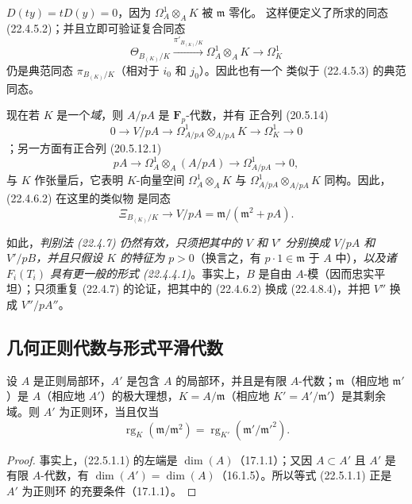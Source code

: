 \begin{remark}[22.4.8]

$D(ty)=tD(y)=0$，因为 $\Omega^1_A\otimes_AK$ 被 $\mathfrak m$ 零化。
这样便定义了所求的同态 (22.4.5.2)；并且立即可验证复合同态
\[
  \Theta_{B_{(K)}/K}\xrightarrow{\pi'_{B_{(K)}/K}}
  \Omega^1_A\otimes_AK\longrightarrow\Omega^1_K
\]
仍是典范同态 $\pi_{B_{(K)}/K}$（相对于 $i_0$ 和 $j_0$）。因此也有一个
类似于 (22.4.5.3) 的典范同态。

现在若 $K$ 是一个\emph{域}，则 $A/pA$ 是 $\mathbf F_p$-代数，并有
正合列 (20.5.14)
\[
  0\longrightarrow V/pA\longrightarrow
  \Omega^1_{A/pA}\otimes_{A/pA}K\longrightarrow\Omega^1_K\longrightarrow0
\]
；另一方面有正合列 (20.5.12.1)
\[
  pA\longrightarrow\Omega^1_A\otimes_A(A/pA)
  \longrightarrow\Omega^1_{A/pA}\longrightarrow0,
\]
与 $K$ 作张量后，它表明 $K$-向量空间
$\Omega^1_A\otimes_AK$ 与
$\Omega^1_{A/pA}\otimes_{A/pA}K$ 同构。因此，(22.4.6.2) 在这里的类似物
是同态
\begin{equation}
\label{0.22.4.8.4-fr}
  \Xi_{B_{(K)}/K}\longrightarrow V/pA=\mathfrak m/(\mathfrak m^2+pA).
  \tag{22.4.8.4}
\end{equation}

如此，\emph{判别法 (22.4.7) 仍然有效，只须把其中的 $V$ 和 $V'$ 分别换成
$V/pA$ 和 $V'/pB$，并且只假设 $K$ 的特征为 $p>0$}（换言之，有
$p\cdot1\in\mathfrak m$ 于 $A$ 中），\emph{以及诸 $F_i(T_i)$ 具有更一般的形式
(22.4.4.1)}。事实上，$B$ 是自由 $A$-模（因而忠实平坦）；只须重复
(22.4.7) 的论证，把其中的 (22.4.6.2) 换成 (22.4.8.4)，并把 $V''$ 换成
$V''/pA''$。
\end{remark}

\subsection{几何正则代数与形式平滑代数}
\label{subsection:0.22.5-fr}

\begin{proposition}[22.5.1]
\label{0.22.5.1-fr}
设 $A$ 是正则局部环，$A'$ 是包含 $A$ 的局部环，并且是有限
$A$-代数；$\mathfrak m$（相应地 $\mathfrak m'$）是 $A$（相应地
$A'$）的极大理想，$K=A/\mathfrak m$（相应地
$K'=A'/\mathfrak m'$）是其剩余域。则 $A'$ 为正则环，当且仅当
\begin{equation}
\label{0.22.5.1.1-fr}
  \operatorname{rg}_K(\mathfrak m/\mathfrak m^2)
  =\operatorname{rg}_{K'}(\mathfrak m'/\mathfrak m'^2).
  \tag{22.5.1.1}
\end{equation}
\end{proposition}

\begin{proof}
事实上，(22.5.1.1) 的左端是 $\dim(A)$（17.1.1）；又因
$A\subset A'$ 且 $A'$ 是有限 $A$-代数，有
$\dim(A')=\dim(A)$（16.1.5）。所以等式 (22.5.1.1) 正是 $A'$ 为正则环
的充要条件（17.1.1）。
\end{proof}

